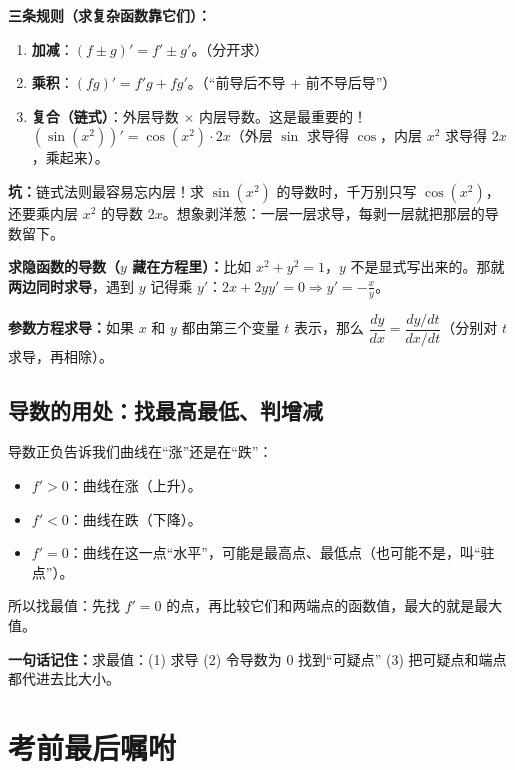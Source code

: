﻿\documentclass[11pt,a4paper,UTF8]{ctexart}
\newcommand{\idea}[1]{\par\smallskip\noindent\colorbox{yellow!22}{\textbf{一句话记住：}#1}\par\smallskip}
\newcommand{\warn}[1]{\par\smallskip\noindent\textcolor{red!70!black}{\textbf{坑：}#1}\par\smallskip}
\begin{document}
\textbf{三条规则（求复杂函数靠它们）：}
\begin{enumerate}[leftmargin=1.4em]
\item \textbf{加减}：$(f\pm g)'=f'\pm g'$。（分开求）
\item \textbf{乘积}：$(fg)'=f'g+fg'$。（“前导后不导 + 前不导后导”）
\item \textbf{复合（链式）}：外层导数 $\times$ 内层导数。这是最重要的！$(\sin(x^2))'=\cos(x^2)\cdot 2x$（外层 $\sin$ 求导得 $\cos$，内层 $x^2$ 求导得 $2x$，乘起来）。
\end{enumerate}

\warn{链式法则最容易忘内层！求 $\sin(x^2)$ 的导数时，千万别只写 $\cos(x^2)$，还要乘内层 $x^2$ 的导数 $2x$。想象剥洋葱：一层一层求导，每剥一层就把那层的导数留下。}

\textbf{求隐函数的导数（$y$ 藏在方程里）：}比如 $x^2+y^2=1$，$y$ 不是显式写出来的。那就\textbf{两边同时求导}，遇到 $y$ 记得乘 $y'$：$2x+2yy'=0\Rightarrow y'=-\frac{x}{y}$。

\textbf{参数方程求导：}如果 $x$ 和 $y$ 都由第三个变量 $t$ 表示，那么 $\dfrac{dy}{dx}=\dfrac{dy/dt}{dx/dt}$（分别对 $t$ 求导，再相除）。

\subsection{导数的用处：找最高最低、判增减}

导数正负告诉我们曲线在“涨”还是在“跌”：
\begin{itemize}[leftmargin=1.4em]
\item $f'>0$：曲线在涨（上升）。
\item $f'<0$：曲线在跌（下降）。
\item $f'=0$：曲线在这一点“水平”，可能是最高点、最低点（也可能不是，叫“驻点”）。
\end{itemize}

所以找最值：先找 $f'=0$ 的点，再比较它们和两端点的函数值，最大的就是最大值。

\idea{求最值：(1) 求导 (2) 令导数为 0 找到“可疑点” (3) 把可疑点和端点都代进去比大小。}

\section{考前最后嘱咐}
\end{document}
